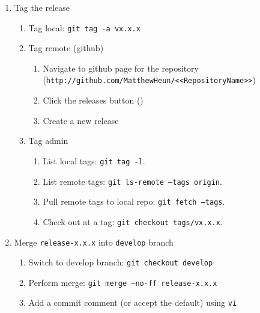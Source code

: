 \documentclass{article}
\begin{document}
\begin{enumerate}
  \item Tag the release
  \begin{enumerate}

    \item Tag local: \texttt{git tag -a vx.x.x}

    \item Tag remote (github)
	\begin{enumerate}

	  \item Navigate to github page for the repository\\
	  		(\texttt{http://github.com/MatthewHeun/<<RepositoryName>>})

	  \item Click the releases button ()
	  
	  \item Create a new release

	\end{enumerate}
	\item Tag admin
	\begin{enumerate}

	  \item List local tags: \texttt{git tag -l}.
	
	  \item List remote tags: \texttt{git ls-remote --tags origin}.

	  \item Pull remote tags to local repo: \texttt{git fetch --tags}.
	
	  \item Check out at a tag: \texttt{git checkout tags/vx.x.x}.

	\end{enumerate}
  \end{enumerate}
  \item Merge \texttt{release-x.x.x} into \texttt{develop} branch
  \begin{enumerate}

	\item Switch to develop branch: \texttt{git checkout develop}

    \item Perform merge: \texttt{git merge --no-ff release-x.x.x}
	
	\item Add a commit comment (or accept the default) using \texttt{vi} 
	

\end{enumerate}
\end{enumerate}
\end{document}
